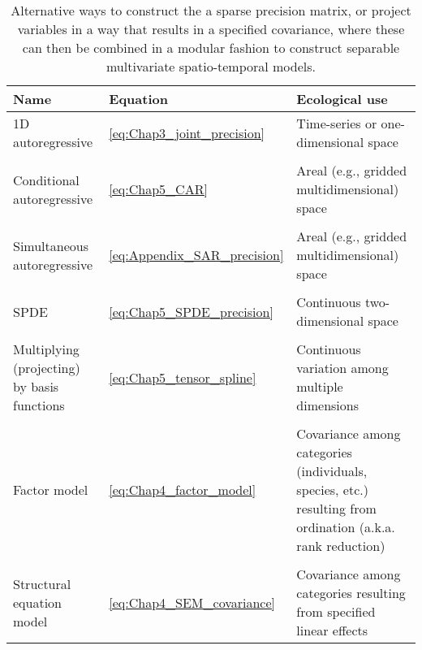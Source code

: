 \begin{table}
  \caption[Modular constructors for sparse precision or covariance]{Alternative ways to construct the a sparse precision matrix, or project variables in a way that results in a specified covariance, where these can then be combined in a modular fashion to construct separable multivariate spatio-temporal models.}
\begin{center}
\begin{tabularx}{\textwidth}{ | X m{0.5in} m{2.5in} | } 
  \hline
  Name & Equation & Ecological use \\ 
  \hline

  1D autoregressive &  \ref{eq:Chap3_joint_precision} & Time-series or one-dimensional space \\ & & \\ 
  
  Conditional autoregressive &  \ref{eq:Chap5_CAR} & Areal (e.g., gridded multidimensional) space \\ & & \\ 
  
  Simultaneous autoregressive &  \ref{eq:Appendix_SAR_precision} & Areal (e.g., gridded multidimensional) space \\ & & \\ 
  
  SPDE & \ref{eq:Chap5_SPDE_precision} & Continuous two-dimensional space \\ & & \\

  Multiplying (projecting) by basis functions & \ref{eq:Chap5_tensor_spline} & Continuous variation among multiple dimensions \\ & & \\ 
  
  Factor model & \ref{eq:Chap4_factor_model} & Covariance among categories (individuals, species, etc.) resulting from ordination (a.k.a. rank reduction) \\ & & \\ 
  
  Structural equation model & \ref{eq:Chap4_SEM_covariance} & Covariance among categories resulting from specified linear effects \\  
  
  \hline
\end{tabularx}
  \label{tab:Chap12_modular_elements}
\end{center}
\end{table}

